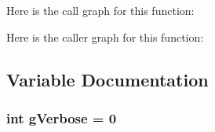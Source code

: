Here is the call graph for this function\+:




Here is the caller graph for this function\+:




\subsection{Variable Documentation}
\subsubsection[{\texorpdfstring{g\+Verbose}{gVerbose}}]{\setlength{\rightskip}{0pt plus 5cm}int g\+Verbose = 0\hspace{0.3cm}{\ttfamily [static]}}\hypertarget{tap-creator_8cc_a80b7a0563409f3e21c80e0459c85845e}{}\label{tap-creator_8cc_a80b7a0563409f3e21c80e0459c85845e}
